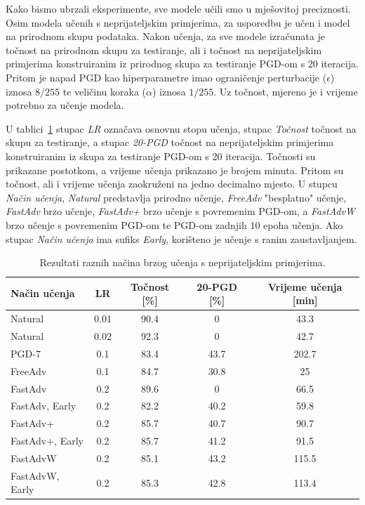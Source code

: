 \documentclass[times, utf8, zavrsni, numeric]{fer}
\begin{document}
Kako bismo ubrzali eksperimente, sve modele učili smo u mješovitoj preciznosti.
Osim modela učenih s neprijateljskim primjerima, za usporedbu je učen i model na prirodnom skupu podataka. Nakon učenja, za sve modele izračunata je točnost na prirodnom skupu za testiranje,
ali i točnost na neprijateljskim primjerima konstruiranim iz prirodnog skupa za testiranje PGD-om s 20 iteracija. 
Pritom je napad PGD kao hiperparametre imao ograničenje perturbacije ($\epsilon$) iznosa $8/255$ te veličinu koraka ($\alpha$) iznosa $1/255$.
Uz točnost, mjereno je i vrijeme potrebno za učenje modela.

\pagebreak

U tablici~\ref{tbl:mjerenja_robusno_ucenje} stupac \textit{LR} označava osnovnu stopu učenja, stupac \textit{Točnost} točnost na skupu za testiranje, a stupac \textit{20-PGD} točnost na neprijateljskim primjerima konstruiranim iz skupa za testiranje PGD-om s 20 iteracija.
Točnosti su prikazane postotkom, a vrijeme učenja prikazano je brojem minuta. Pritom su točnost, ali i vrijeme učenja zaokruženi na jedno decimalno mjesto.
U stupcu \textit{Način učenja}, \textit{Natural} predstavlja prirodno učenje, \textit{FreeAdv} "besplatno" učenje, \textit{FastAdv} brzo učenje, 
\textit{FastAdv+} brzo učenje s povremenim PGD-om, a \textit{FastAdvW} brzo učenje s povremenim PGD-om te PGD-om zadnjih 10 epoha učenja.
Ako stupac \textit{Način učenja} ima sufiks \textit{Early}, korišteno je učenje s ranim zaustavljanjem.

\begin{table}[htb]
    \caption{Rezultati raznih načina brzog učenja s neprijateljskim primjerima.}
    \label{tbl:mjerenja_robusno_ucenje}
    \centering
    \begin{tabular}{lcccc} \hline
    Način učenja & LR & Točnost [\%] & 20-PGD [\%] & Vrijeme učenja [min]\\ \hline
    Natural & 0.01 & 90.4 & 0 & 43.3 \\
    Natural & 0.02 & 92.3 & 0 & 42.7 \\
    PGD-7 & 0.1 & 83.4 & 43.7 & 202.7 \\
    FreeAdv & 0.1 & 84.7 & 30.8 & 25 \\
    FastAdv & 0.2 & 89.6 & 0 & 66.5 \\
    FastAdv, Early & 0.2 & 82.2 & 40.2 & 59.8 \\
    FastAdv+ & 0.2 & 85.7 & 40.7 & 90.7 \\
    FastAdv+, Early & 0.2 & 85.7 & 41.2 & 91.5 \\
    FastAdvW & 0.2 & 85.1 & 43.2 & 115.5 \\
    FastAdvW, Early & 0.2 & 85.3 & 42.8 & 113.4 \\ \hline
    \end{tabular}
\end{table}    
\end{document}
